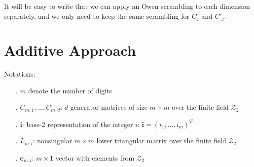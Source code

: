 \documentclass[]{elsarticle}
\theoremstyle{definition}
\newcommand{\bvec}[1]{\boldsymbol{#1}}
\newcommand{\vi}{\bvec{i}}
\newcommand{\ve}{\bvec{e}}
\begin{document}
It will be easy to write that we can apply an Owen scrambling to each dimension separately, and we only need to keep the same scrambling for $C_j$ and $C'_j$.


\section{Additive Approach}
Notations:
\begin{itemize}
\item[.] $m$ denote the number of digits
\item[.] $C_{m,1},\dots,C_{m,d}$: $d$ generator matrices of size $m \times m$ over the finite field $\mathcal{Z}_2$
\item[.] $\vi$: base-$2$ representation of the integer $i$: $\vi=(i_1,\dots,i_m)^T$
\item[.] $L_{m,l}$: nonsingular $m \times m$ lower triangular matrix over the finite field $\mathcal{Z}_2$
\item[.] $\ve_{m,l}$: $m \times 1$ vector with elements from $\mathcal{Z}_2$
\end{itemize}
\end{document}
